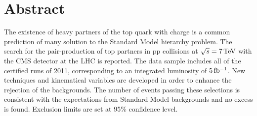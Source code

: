 \begingroup
\let\clearpage\relax
\let\cleardoublepage\relax
\let\cleardoublepage\relax

\chapter*{Abstract}
The existence of heavy partners of the top quark with charge 
is a common prediction of many solution to the Standard Model hierarchy
problem. The search for the pair-production of top partners in $\mathrm{pp}$ collisions at
$\sqrt{s} = \unit[7]{TeV}$ with the CMS detector at the LHC is reported. The
data sample includes all of the certified runs of 2011, corresponding to an
integrated luminosity of
$\unit[5]{fb^{-1}}$.
New techniques and kinematical variables are developed in order to enhance
the rejection of the backgrounds.
The number of events passing these selections is consistent with the
expectations from Standard Model backgrounds and no excess is found.
Exclusion limits are set at 95\% confidence level. 





\endgroup			

\vfill

